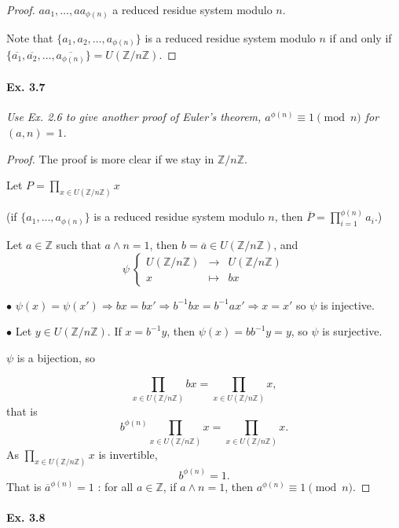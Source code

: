 \documentclass[11pt,a4paper]{article}
\newcommand{\Z}{\mathbb{Z}}
\begin{document}
{\begin{proof}
$aa_1, \ldots, aa_{\phi(n)}$ a reduced residue system modulo $n$.

\medskip

Note that $\{a_1,a_2,\ldots, a_{\phi(n)}\}$ is a reduced residue system modulo $n$  if and only if $\{\overline{a_1},\overline{a_2},\ldots,\overline{a_{\phi(n)}}\} = U(\Z/n\Z)$.
\end{proof}

\paragraph{Ex. 3.7}

{\it Use Ex. 2.6 to give another proof of Euler's theorem, $a^{\phi(n)} \equiv 1 \pmod n$ for $(a, n) = 1$.
}

\begin{proof}
The proof is more clear if we stay in $\Z/n\Z$.

Let $P = \prod\limits_{x \in U(\Z/n\Z)} x$

(if $\{a_1,\ldots,a_{\phi(n)}\}$ is a reduced residue system modulo $n$, then $\overline{P} = \prod\limits_{i=1}^{\phi(n)} a_{i}$.)

Let $a \in \Z$ such that $a \wedge n = 1$, then $b = \overline{a} \in U(\Z/n\Z)$, and
$$
\psi \ 
\left\{
\begin{array}{ccc}
 U(\Z/n\Z) &  \to  &   U(\Z/n\Z)  \\
  x &\mapsto   &bx   
\end{array}
\right.
$$

$\bullet$ $\psi(x) = \psi(x') \Rightarrow bx = bx' \Rightarrow b^{-1} b x = b^{-1} a x' \Rightarrow x = x'$ so $\psi$ is injective.

$\bullet$ Let $y \in U(\Z/n\Z)$. If $x = b^{-1}y$, then $\psi(x) = b b^{-1} y = y$, so $\psi$ is surjective.

$\psi$ is a bijection, so

$$\prod_{x \in U(\Z/n\Z) } bx = \prod_{x \in U(\Z/n\Z) } x,$$
that is
$$b^{\phi(n)} \prod_{x \in U(\Z/n\Z) } x = \prod_{x \in U(\Z/n\Z) } x.$$
As $\prod\limits_{x \in U(\Z/n\Z) } x$ is invertible, 
$$b^{\phi(n)} = 1.$$
That is $\overline{a}^{\phi(n)} = 1$ : for all $a\in \Z$, if $a\wedge n = 1$, then $a^{\phi(n)} \equiv 1 \pmod n$. 
\end{proof}

\paragraph{Ex. 3.8}

}
\end{document}

